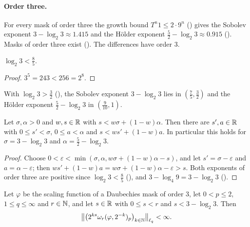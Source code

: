 \paragraph{Order three.}
For every mask of order three the growth bound $T^n 1 \leq 2 \cdot 9^n$
() gives the Sobolev exponent $3 - \log_2 3 \approx 1.415$ and the
H\"older exponent $\frac52 - \log_2 3 \approx 0.915$ ().
Masks of order three exist (). The differences have order $3$.

\begin{lemma}
\label{lem:daub-logb-two-three}
\leanok
$\log_2 3 < \frac85$.
\end{lemma}

\begin{proof}
\leanok
$3^5 = 243 < 256 = 2^8$.
\end{proof}

With $\log_2 3 > \frac32$ (), the Sobolev exponent
$3 - \log_2 3$ lies in $(\frac75, \frac32)$ and the H\"older exponent $\frac52 - \log_2 3$ in
$(\frac{9}{10}, 1)$.

\begin{lemma}
\label{lem:daub-orders-below-bounds}
\leanok
Let $\sigma, \alpha > 0$ and $w, s \in \mathbb{R}$ with $s < w \sigma + (1 - w) \alpha$. Then there are
$s', a \in \mathbb{R}$ with $0 \leq s' < \sigma$, $0 \leq a < \alpha$ and $s < w s' + (1 - w) a$. In
particular this holds for $\sigma = 3 - \log_2 3$ and $\alpha = \frac52 - \log_2 3$.
\end{lemma}

\begin{proof}
\leanok
{}
Choose $0 < \varepsilon < \min(\sigma, \alpha, w \sigma + (1 - w) \alpha - s)$, and let
$s' = \sigma - \varepsilon$ and $a = \alpha - \varepsilon$; then
$w s' + (1 - w) a = w \sigma + (1 - w) \alpha - \varepsilon > s$. Both exponents of order three
are positive since $\log_2 3 < \frac85$ (), and
$3 - \log_4 9 = 3 - \log_2 3$ ().
\end{proof}

\begin{proposition}
\label{prop:daub-besov-seminorm-order-three}
\leanok
{}
Let $\varphi$ be the scaling function of a Daubechies mask of order $3$, let $0 < p \leq 2$,
$1 \leq q \leq \infty$ and $r \in \mathbb{N}$, and let $s \in \mathbb{R}$ with $0 \leq s < r$ and
$s < 3 - \log_2 3$. Then
\[
  \bigl\|\bigl(2^{ks} \omega_r(\varphi, 2^{-k})_p\bigr)_{k \in \mathbb{N}}\bigr\|_{\ell_q} < \infty .
\]
\end{proposition}

